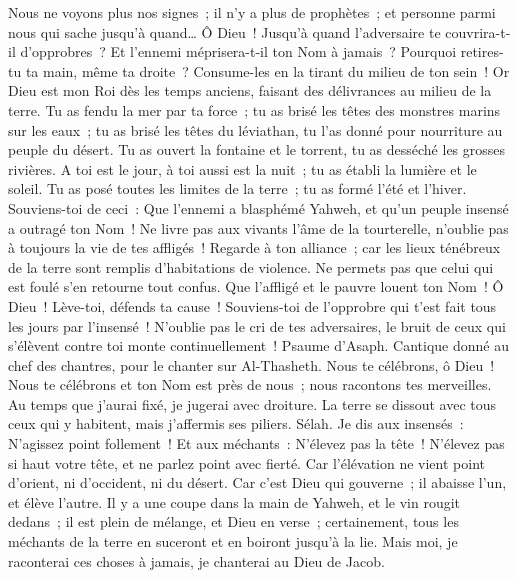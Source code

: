 \begin{multicols}{2}
Nous ne voyons plus nos signes~; il n'y a plus de prophètes~; et personne parmi nous qui sache jusqu'à quand…
Ô Dieu~! Jusqu'à quand l'adversaire te couvrira-t-il d'opprobres~? Et l'ennemi méprisera-t-il ton Nom à jamais~?
Pourquoi retires-tu ta main, même ta droite~? Consume-les en la tirant du milieu de ton sein~!
Or Dieu est mon Roi dès les temps anciens, faisant des délivrances au milieu de la terre.
Tu as fendu la mer par ta force~; tu as brisé les têtes des monstres marins sur les eaux~;
tu as brisé les têtes du léviathan, tu l'as donné pour nourriture au peuple du désert.
Tu as ouvert la fontaine et le torrent, tu as desséché les grosses rivières.
A toi est le jour, à toi aussi est la nuit~; tu as établi la lumière et le soleil.
Tu as posé toutes les limites de la terre~; tu as formé l'été et l'hiver.
Souviens-toi de ceci~: Que l'ennemi a blasphémé Yahweh, et qu'un peuple insensé a outragé ton Nom~!
Ne livre pas aux vivants l'âme de la tourterelle, n'oublie pas à toujours la vie de tes affligés~!
Regarde à ton alliance~; car les lieux ténébreux de la terre sont remplis d'habitations de violence.
Ne permets pas que celui qui est foulé s'en retourne tout confus. Que l'affligé et le pauvre louent ton Nom~!
Ô Dieu~! Lève-toi, défends ta cause~! Souviens-toi de l'opprobre qui t'est fait tous les jours par l'insensé~!
N'oublie pas le cri de tes adversaires, le bruit de ceux qui s'élèvent contre toi monte continuellement~!
\VerseOne{}Psaume d'Asaph. Cantique donné au chef des chantres, pour le chanter sur Al-Thasheth.
Nous te célébrons, ô Dieu~! Nous te célébrons et ton Nom est près de nous~; nous racontons tes merveilles.
Au temps que j'aurai fixé, je jugerai avec droiture.
La terre se dissout avec tous ceux qui y habitent, mais j'affermis ses piliers. Sélah.
Je dis aux insensés~: N'agissez point follement~! Et aux méchants~: N'élevez pas la tête~!
N'élevez pas si haut votre tête, et ne parlez point avec fierté.
Car l'élévation ne vient point d'orient, ni d'occident, ni du désert.
Car c'est Dieu qui gouverne~; il abaisse l'un, et élève l'autre.
Il y a une coupe dans la main de Yahweh, et le vin rougit dedans~; il est plein de mélange, et Dieu en verse~; certainement, tous les méchants de la terre en suceront et en boiront jusqu'à la lie.
Mais moi, je raconterai ces choses à jamais, je chanterai au Dieu de Jacob.

\end{multicols}

